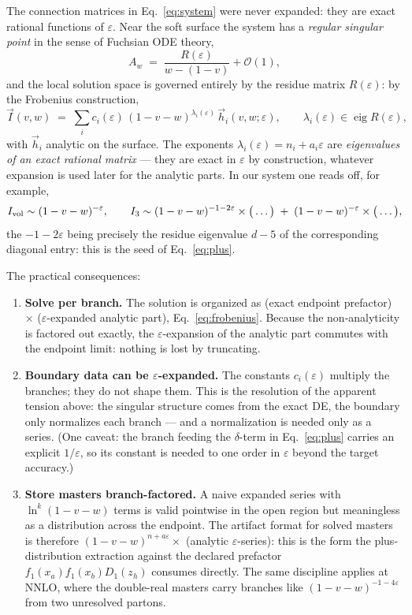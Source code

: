 \documentclass[11pt]{article}
\newcommand{\eps}{\varepsilon}
\begin{document}
The connection matrices in Eq.~\eqref{eq:system} were never expanded:
they are exact rational functions of $\eps$.  Near the soft surface
the system has a \emph{regular singular point} in the sense of
Fuchsian ODE theory,
\begin{equation}
  A_w \;=\; \frac{R(\eps)}{w - (1-v)} + \mathcal{O}(1),
\end{equation}
and the local solution space is governed entirely by the residue
matrix $R(\eps)$: by the Frobenius construction,
\begin{equation}
  \vec I(v,w)
  \;=\;
  \sum_i c_i(\eps)\,(1-v-w)^{\lambda_i(\eps)}\,
  \vec h_i(v,w;\eps),
  \qquad
  \lambda_i(\eps) \in \operatorname{eig} R(\eps),
  \label{eq:frobenius}
\end{equation}
with $\vec h_i$ analytic on the surface.  The exponents
$\lambda_i(\eps) = n_i + a_i\eps$ are \emph{eigenvalues of an exact
rational matrix} --- they are exact in $\eps$ by construction,
whatever expansion is used later for the analytic parts.  In our
system one reads off, for example,
\begin{equation}
  I_{\rm vol} \sim (1-v-w)^{-\eps},
  \qquad
  I_{3} \sim (1-v-w)^{-1-2\eps} \times \big(\dots\big)
  \;+\; (1-v-w)^{-\eps} \times \big(\dots\big),
\end{equation}
the $-1-2\eps$ being precisely the residue eigenvalue $d-5$ of the
corresponding diagonal entry: this is the seed of
Eq.~\eqref{eq:plus}.

The practical consequences:
\begin{enumerate}
\item \textbf{Solve per branch.}  The solution is organized as
  (exact endpoint prefactor) $\times$ ($\eps$-expanded analytic
  part), Eq.~\eqref{eq:frobenius}.  Because the non-analyticity is
  factored out exactly, the $\eps$-expansion of the analytic part
  commutes with the endpoint limit: nothing is lost by truncating.
\item \textbf{Boundary data can be $\eps$-expanded.}  The constants
  $c_i(\eps)$ multiply the branches; they do not shape them.  This is
  the resolution of the apparent tension above: the singular
  structure comes from the exact DE, the boundary only normalizes
  each branch --- and a normalization is needed only as a series.
  (One caveat: the branch feeding the $\delta$-term in
  Eq.~\eqref{eq:plus} carries an explicit $1/\eps$, so its constant
  is needed to one order in $\eps$ beyond the target accuracy.)
\item \textbf{Store masters branch-factored.}  A naive expanded
  series with $\ln^k(1-v-w)$ terms is valid pointwise in the open
  region but meaningless as a distribution across the endpoint.  The
  artifact format for solved masters is therefore
  $(1-v-w)^{n+a\eps} \times$ (analytic $\eps$-series): this is the
  form the plus-distribution extraction against the declared
  prefactor $f_1(x_a) f_1(x_b) D_1(z_h)$ consumes directly.  The same
  discipline applies at NNLO, where the double-real masters carry
  branches like $(1-v-w)^{-1-4\eps}$ from two unresolved partons.
\end{enumerate}
\end{document}
